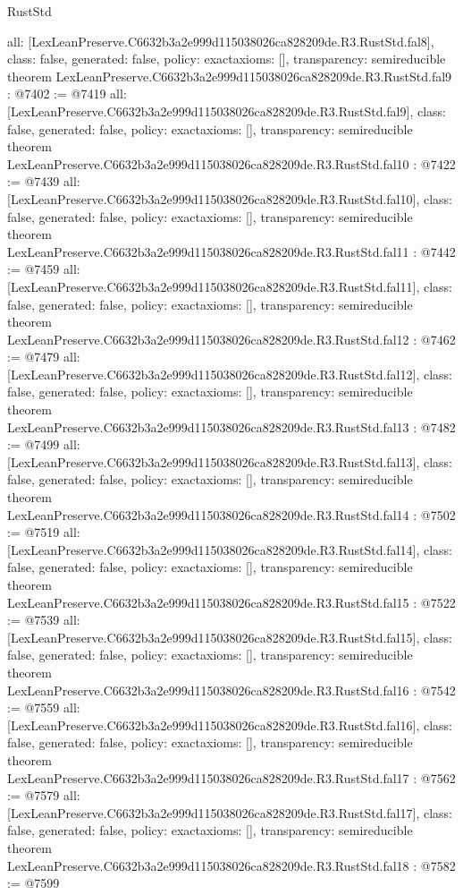 \begin{lexlean}{RustStd}
\begin{coremodule}
{  all: [LexLeanPreserve.C6632b3a2e999d115038026ca828209de.R3.RustStd.fal8],
  class: false,
  generated: false,
  policy: exact{axioms: []},
  transparency: semireducible
}
theorem LexLeanPreserve.C6632b3a2e999d115038026ca828209de.R3.RustStd.fal9 : @7402 := @7419 {
  all: [LexLeanPreserve.C6632b3a2e999d115038026ca828209de.R3.RustStd.fal9],
  class: false,
  generated: false,
  policy: exact{axioms: []},
  transparency: semireducible
}
theorem LexLeanPreserve.C6632b3a2e999d115038026ca828209de.R3.RustStd.fal10 : @7422 := @7439 {
  all: [LexLeanPreserve.C6632b3a2e999d115038026ca828209de.R3.RustStd.fal10],
  class: false,
  generated: false,
  policy: exact{axioms: []},
  transparency: semireducible
}
theorem LexLeanPreserve.C6632b3a2e999d115038026ca828209de.R3.RustStd.fal11 : @7442 := @7459 {
  all: [LexLeanPreserve.C6632b3a2e999d115038026ca828209de.R3.RustStd.fal11],
  class: false,
  generated: false,
  policy: exact{axioms: []},
  transparency: semireducible
}
theorem LexLeanPreserve.C6632b3a2e999d115038026ca828209de.R3.RustStd.fal12 : @7462 := @7479 {
  all: [LexLeanPreserve.C6632b3a2e999d115038026ca828209de.R3.RustStd.fal12],
  class: false,
  generated: false,
  policy: exact{axioms: []},
  transparency: semireducible
}
theorem LexLeanPreserve.C6632b3a2e999d115038026ca828209de.R3.RustStd.fal13 : @7482 := @7499 {
  all: [LexLeanPreserve.C6632b3a2e999d115038026ca828209de.R3.RustStd.fal13],
  class: false,
  generated: false,
  policy: exact{axioms: []},
  transparency: semireducible
}
theorem LexLeanPreserve.C6632b3a2e999d115038026ca828209de.R3.RustStd.fal14 : @7502 := @7519 {
  all: [LexLeanPreserve.C6632b3a2e999d115038026ca828209de.R3.RustStd.fal14],
  class: false,
  generated: false,
  policy: exact{axioms: []},
  transparency: semireducible
}
theorem LexLeanPreserve.C6632b3a2e999d115038026ca828209de.R3.RustStd.fal15 : @7522 := @7539 {
  all: [LexLeanPreserve.C6632b3a2e999d115038026ca828209de.R3.RustStd.fal15],
  class: false,
  generated: false,
  policy: exact{axioms: []},
  transparency: semireducible
}
theorem LexLeanPreserve.C6632b3a2e999d115038026ca828209de.R3.RustStd.fal16 : @7542 := @7559 {
  all: [LexLeanPreserve.C6632b3a2e999d115038026ca828209de.R3.RustStd.fal16],
  class: false,
  generated: false,
  policy: exact{axioms: []},
  transparency: semireducible
}
theorem LexLeanPreserve.C6632b3a2e999d115038026ca828209de.R3.RustStd.fal17 : @7562 := @7579 {
  all: [LexLeanPreserve.C6632b3a2e999d115038026ca828209de.R3.RustStd.fal17],
  class: false,
  generated: false,
  policy: exact{axioms: []},
  transparency: semireducible
}
theorem LexLeanPreserve.C6632b3a2e999d115038026ca828209de.R3.RustStd.fal18 : @7582 := @7599 {
}
\end{coremodule}
\end{lexlean}
